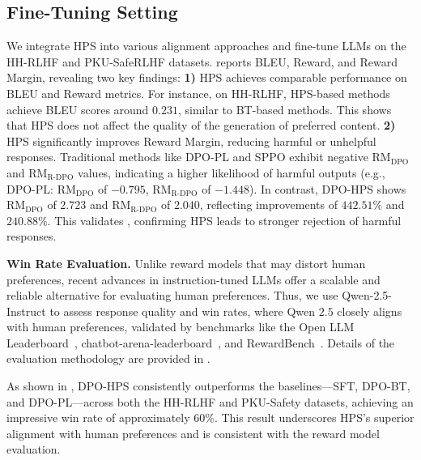 \subsection{Fine-Tuning Setting}\label{finetune}
\vspace{-4pt}
We integrate HPS into various alignment approaches and fine-tune LLMs on the HH-RLHF and PKU-SafeRLHF datasets.  reports BLEU, Reward, and Reward Margin, revealing two key findings: \textbf{1)} HPS achieves comparable performance on BLEU and Reward metrics. For instance, on HH-RLHF, HPS-based methods achieve BLEU scores around $0.231$, similar to BT-based methods.  This shows that HPS does not affect the quality of the generation of preferred content. \textbf{2)}  HPS significantly improves Reward Margin, reducing harmful or unhelpful responses. Traditional methods like DPO-PL and SPPO exhibit negative $\text{RM}_{\text{DPO}}$ and $\text{RM}_{\text{R-DPO}}$ values, indicating a higher likelihood of harmful outputs (e.g., DPO-PL: $\text{RM}_{\text{DPO}}$ of $-0.795$, $\text{RM}_{\text{R-DPO}}$ of $-1.448$). In contrast, DPO-HPS shows $\text{RM}_{\text{DPO}}$ of $2.723$ and $\text{RM}_{\text{R-DPO}}$ of $2.040$, reflecting improvements of $442.51\%$ and $240.88\%$. This validates , confirming HPS leads to stronger rejection of harmful responses. 
 
\noindent\textbf{Win Rate Evaluation.}
 Unlike reward models that may distort human preferences, recent advances in instruction-tuned LLMs offer a scalable and reliable alternative for evaluating human preferences. Thus, we use Qwen-2.5-Instruct to assess response quality and win rates, where Qwen $2.5$ closely aligns with human preferences, validated by benchmarks like the Open LLM Leaderboard~\cite{llmbench}, chatbot-arena-leaderboard~\cite{chatarena}, and RewardBench~\cite{RewardBench}. Details of the evaluation methodology are provided in .
 
 As shown in , DPO-HPS consistently outperforms the baselines---SFT, DPO-BT, and DPO-PL---across both the HH-RLHF and PKU-Safety datasets, achieving an impressive win rate of approximately 60\%. This result underscores HPS's superior alignment with human preferences and is consistent with the reward model evaluation.

